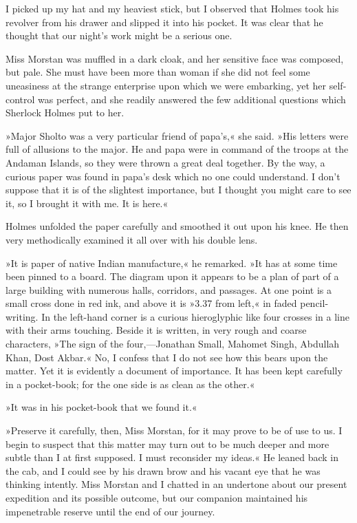 I picked up my hat and my heaviest stick, but I observed that Holmes took his revolver from his drawer and slipped it into his pocket. It was clear that he thought that our night's work might be a serious one.

Miss Morstan was muffled in a dark cloak, and her sensitive face was composed, but pale. She must have been more than woman if she did not feel some uneasiness at the strange enterprise upon which we were embarking, yet her self-control was perfect, and she readily answered the few additional questions which Sherlock Holmes put to her.

»Major Sholto was a very particular friend of papa's,« she said. »His letters were full of allusions to the major. He and papa were in command of the troops at the Andaman Islands, so they were thrown a great deal together. By the way, a curious paper was found in papa's desk which no one could understand. I don't suppose that it is of the slightest importance, but I thought you might care to see it, so I brought it with me. It is here.«

Holmes unfolded the paper carefully and smoothed it out upon his knee. He then very methodically examined it all over with his double lens.

»It is paper of native Indian manufacture,« he remarked. »It has at some time been pinned to a board. The diagram upon it appears to be a plan of part of a large building with numerous halls, corridors, and passages. At one point is a small cross done in red ink, and above it is »3.37 from left,« in faded pencil-writing. In the left-hand corner is a curious hieroglyphic like four crosses in a line with their arms touching. Beside it is written, in very rough and coarse characters, »The sign of the four,—Jonathan Small, Mahomet Singh, Abdullah Khan, Dost Akbar.« No, I confess that I do not see how this bears upon the matter. Yet it is evidently a document of importance. It has been kept carefully in a pocket-book; for the one side is as clean as the other.«

»It was in his pocket-book that we found it.«

»Preserve it carefully, then, Miss Morstan, for it may prove to be of use to us. I begin to suspect that this matter may turn out to be much deeper and more subtle than I at first supposed. I must reconsider my ideas.« He leaned back in the cab, and I could see by his drawn brow and his vacant eye that he was thinking intently. Miss Morstan and I chatted in an undertone about our present expedition and its possible outcome, but our companion maintained his impenetrable reserve until the end of our journey.

